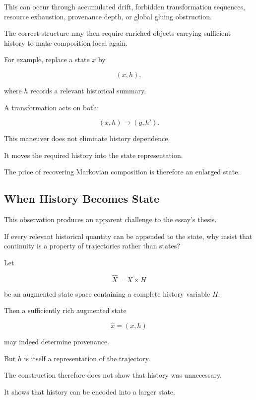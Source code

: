 \documentclass[
  11pt,
  a4paper,
  DIV=12,
  BCOR=0mm,
  parskip=half-
]{scrartcl}
\theoremstyle{definition}
\theoremstyle{plain}
\theoremstyle{remark}
\begin{document}
This can occur through accumulated drift, forbidden transformation sequences,
resource exhaustion, provenance depth, or global gluing obstruction.

The correct structure may then require enriched objects carrying sufficient
history to make composition local again.

For example, replace a state \(x\) by

\[
  (x,h),
\]

where \(h\) records a relevant historical summary.

A transformation acts on both:

\[
  (x,h)
  \longrightarrow
  (y,h').
\]

This maneuver does not eliminate history dependence.

It moves the required history into the state representation.

The price of recovering Markovian composition is therefore an enlarged state.


\subsection{When History Becomes State}
\label{app:history-becomes-state}

This observation produces an apparent challenge to the essay's thesis.

If every relevant historical quantity can be appended to the state, why insist
that continuity is a property of trajectories rather than states?

Let

\[
  \widehat X
  =
  X\times H
\]

be an augmented state space containing a complete history variable \(H\).

Then a sufficiently rich augmented state

\[
  \widehat x=(x,h)
\]

may indeed determine provenance.

But \(h\) is itself a representation of the trajectory.

The construction therefore does not show that history was unnecessary.

It shows that history can be encoded into a larger state.
\end{document}

